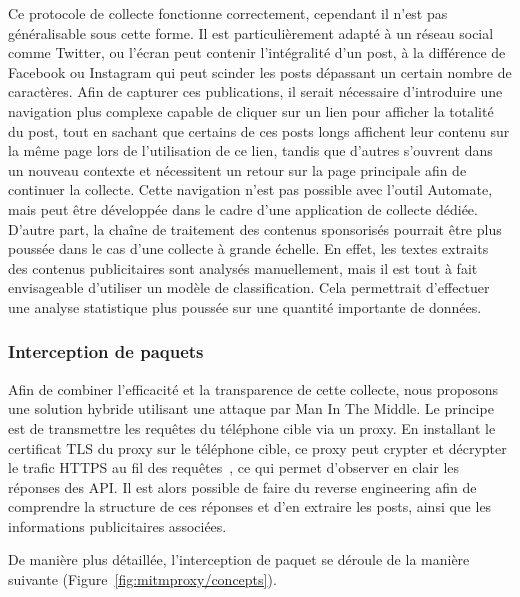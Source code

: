 \documentclass[runningheads]{llncs}
\begin{document}
Ce protocole de collecte fonctionne correctement, cependant il n'est pas généralisable sous cette forme. Il est particulièrement adapté à un réseau social comme Twitter, ou l'écran peut contenir l'intégralité d'un post, à la différence de Facebook ou Instagram qui peut scinder les posts dépassant un certain nombre de caractères. Afin de capturer ces publications, il serait nécessaire d'introduire une navigation plus complexe capable de cliquer sur un lien pour afficher la totalité du post, tout en sachant que certains de ces posts longs affichent leur contenu sur la même page lors de l'utilisation de ce lien, tandis que d'autres s'ouvrent dans un nouveau contexte et nécessitent un retour sur la page principale afin de continuer la collecte. Cette navigation n'est pas possible avec l'outil Automate, mais peut être développée dans le cadre d'une application de collecte dédiée.
D'autre part, la chaîne de traitement des contenus sponsorisés pourrait être plus poussée dans le cas d'une collecte à grande échelle. En effet, les textes extraits des contenus publicitaires sont analysés manuellement, mais il est tout à fait envisageable d'utiliser un modèle de classification. Cela permettrait d'effectuer une analyse statistique plus poussée sur une quantité importante de données.

\subsubsection{Interception de paquets}

Afin de combiner l'efficacité et la transparence de cette collecte, nous proposons une solution hybride utilisant une attaque par Man In The Middle.
Le principe est de transmettre les requêtes du téléphone cible via un proxy. En installant le certificat TLS du proxy sur le téléphone cible, ce proxy peut crypter et décrypter le trafic HTTPS au fil des requêtes~\cite{noauthor_mitmproxy_2020}, ce qui permet d'observer en clair les réponses des API. Il est alors possible de faire du reverse engineering afin de comprendre la structure de ces réponses et d'en extraire les posts, ainsi que les informations publicitaires associées. 

De manière plus détaillée, l'interception de paquet se déroule de la manière suivante (Figure~\ref{fig:mitmproxy/concepts}).
\end{document}
